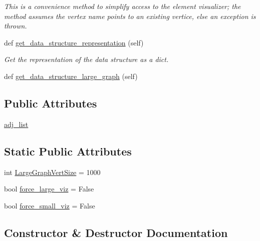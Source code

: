 \begin{DoxyCompactItemize}
\begin{DoxyCompactList}\small\item\em This is a convenience method to simplify access to the element visualizer; the method assumes the vertex name points to an existing vertice, else an exception is thrown. \end{DoxyCompactList}\item 
def \mbox{\hyperlink{classbridges_1_1graph__adj__list_1_1_graph_adj_list_a20ea8a6a1aa03a82223a59474037b3e3}{get\+\_\+data\+\_\+structure\+\_\+representation}} (self)
\begin{DoxyCompactList}\small\item\em Get the representation of the data structure as a dict. \end{DoxyCompactList}\item 
def \mbox{\hyperlink{classbridges_1_1graph__adj__list_1_1_graph_adj_list_aaffde74237de001232e0996a8c64ab82}{get\+\_\+data\+\_\+structure\+\_\+large\+\_\+graph}} (self)
\end{DoxyCompactItemize}
\subsection*{Public Attributes}
\begin{DoxyCompactItemize}
\item 
\mbox{\hyperlink{classbridges_1_1graph__adj__list_1_1_graph_adj_list_ad39dbb3db39a3ffc145c372e6996443c}{adj\+\_\+list}}
\end{DoxyCompactItemize}
\subsection*{Static Public Attributes}
\begin{DoxyCompactItemize}
\item 
int \mbox{\hyperlink{classbridges_1_1graph__adj__list_1_1_graph_adj_list_a093a64ead793e0bd3b1ce4e3456665c9}{Large\+Graph\+Vert\+Size}} = 1000
\item 
bool \mbox{\hyperlink{classbridges_1_1graph__adj__list_1_1_graph_adj_list_aa9f4209af428473fd2d6952a74eb22b9}{force\+\_\+large\+\_\+viz}} = False
\item 
bool \mbox{\hyperlink{classbridges_1_1graph__adj__list_1_1_graph_adj_list_a27900e6bb5504036ccf5ec2e4d301ddb}{force\+\_\+small\+\_\+viz}} = False
\end{DoxyCompactItemize}


\subsection{Constructor \& Destructor Documentation}
\mbox{\label{classbridges_1_1graph__adj__list_1_1_graph_adj_list_a8258a38ef234f4140b971e9fb7be7784}} 
